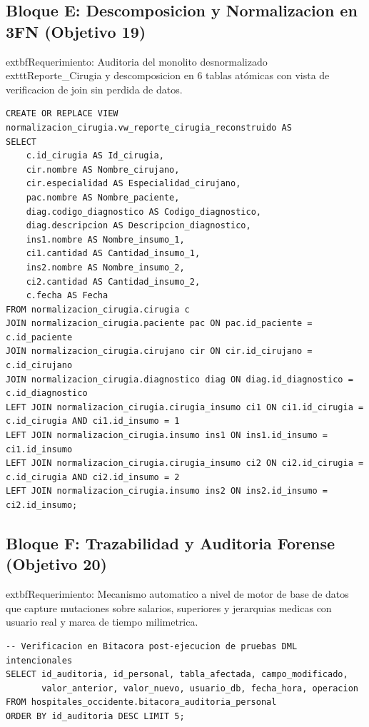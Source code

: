 \documentclass[11pt,a4paper]{article}
\begin{document}
\subsection{Bloque E: Descomposicion y Normalizacion en 3FN (Objetivo 19)}
	extbf{Requerimiento:} Auditoria del monolito desnormalizado 	exttt{Reporte\_Cirugia} y descomposicion en 6 tablas atómicas con vista de verificacion de join sin perdida de datos.
\begin{lstlisting}[style=sqlstyle]
CREATE OR REPLACE VIEW normalizacion_cirugia.vw_reporte_cirugia_reconstruido AS
SELECT 
    c.id_cirugia AS Id_cirugia,
    cir.nombre AS Nombre_cirujano,
    cir.especialidad AS Especialidad_cirujano,
    pac.nombre AS Nombre_paciente,
    diag.codigo_diagnostico AS Codigo_diagnostico,
    diag.descripcion AS Descripcion_diagnostico,
    ins1.nombre AS Nombre_insumo_1,
    ci1.cantidad AS Cantidad_insumo_1,
    ins2.nombre AS Nombre_insumo_2,
    ci2.cantidad AS Cantidad_insumo_2,
    c.fecha AS Fecha
FROM normalizacion_cirugia.cirugia c
JOIN normalizacion_cirugia.paciente pac ON pac.id_paciente = c.id_paciente
JOIN normalizacion_cirugia.cirujano cir ON cir.id_cirujano = c.id_cirujano
JOIN normalizacion_cirugia.diagnostico diag ON diag.id_diagnostico = c.id_diagnostico
LEFT JOIN normalizacion_cirugia.cirugia_insumo ci1 ON ci1.id_cirugia = c.id_cirugia AND ci1.id_insumo = 1
LEFT JOIN normalizacion_cirugia.insumo ins1 ON ins1.id_insumo = ci1.id_insumo
LEFT JOIN normalizacion_cirugia.cirugia_insumo ci2 ON ci2.id_cirugia = c.id_cirugia AND ci2.id_insumo = 2
LEFT JOIN normalizacion_cirugia.insumo ins2 ON ins2.id_insumo = ci2.id_insumo;
\end{lstlisting}

\subsection{Bloque F: Trazabilidad y Auditoria Forense (Objetivo 20)}
	extbf{Requerimiento:} Mecanismo automatico a nivel de motor de base de datos que capture mutaciones sobre salarios, superiores y jerarquias medicas con usuario real y marca de tiempo milimetrica.
\begin{lstlisting}[style=sqlstyle]
-- Verificacion en Bitacora post-ejecucion de pruebas DML intencionales
SELECT id_auditoria, id_personal, tabla_afectada, campo_modificado, 
       valor_anterior, valor_nuevo, usuario_db, fecha_hora, operacion
FROM hospitales_occidente.bitacora_auditoria_personal 
ORDER BY id_auditoria DESC LIMIT 5;
\end{lstlisting}
\end{document}
